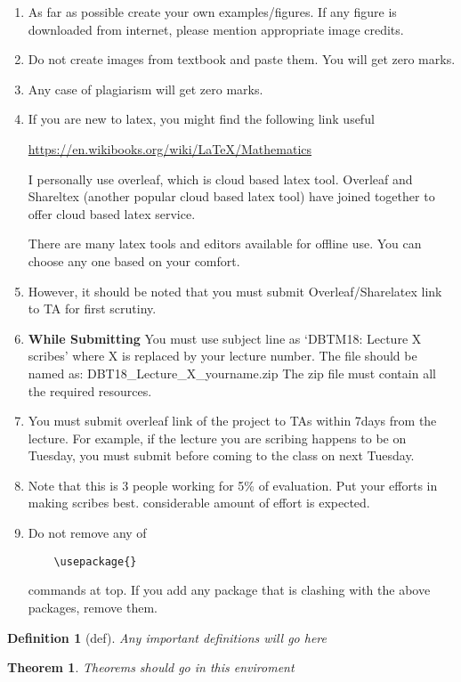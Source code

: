 \documentclass[10pt,a4paper]{article}
\newtheorem{theorem}{Theorem}
\newtheorem{definition}{Definition}
\begin{document}
\begin{enumerate}
\item As far as possible create your own examples/figures.
If any figure is downloaded from internet, please mention appropriate image credits.

\item Do not create images from textbook and paste them. You will get zero marks.

\item Any case of plagiarism will get zero marks. 

\item If you are new to latex,  you might find the following link useful 

\begin{center}

\url{https://en.wikibooks.org/wiki/LaTeX/Mathematics}

\end{center}


I personally use overleaf, which is cloud based latex tool.  Overleaf and Shareltex (another popular cloud based latex tool) have joined together to offer cloud based latex service. 



There are many latex tools and editors available for offline use. You can choose any one based on your comfort.

\item However, it should be noted that you must submit Overleaf/Sharelatex link to TA for first scrutiny.


\item \textbf{While Submitting} You must use subject line as `DBTM18: Lecture X scribes' where X is replaced by your lecture number. The file should be named as: DBT18\_Lecture\_X\_yourname.zip 
The zip file must contain all the required resources.

\item You must submit overleaf link of the project to TAs within 7days from the lecture. For example, if the lecture you are scribing happens to be on Tuesday, you must submit before coming to the class on next Tuesday.

\item Note that this is 3 people working for 5\% of evaluation. Put your efforts in making scribes best.  considerable amount of effort is expected. 

\item Do not remove any of \begin{verbatim}
    \usepackage{} \end{verbatim}commands at top. If you add any package that is clashing with the above packages, remove them.
    


\end{enumerate}

\begin{definition}[def]
Any important definitions will go here
\end{definition}

\begin{theorem}
Theorems should go in this enviroment
\end{theorem}



\end{document}
